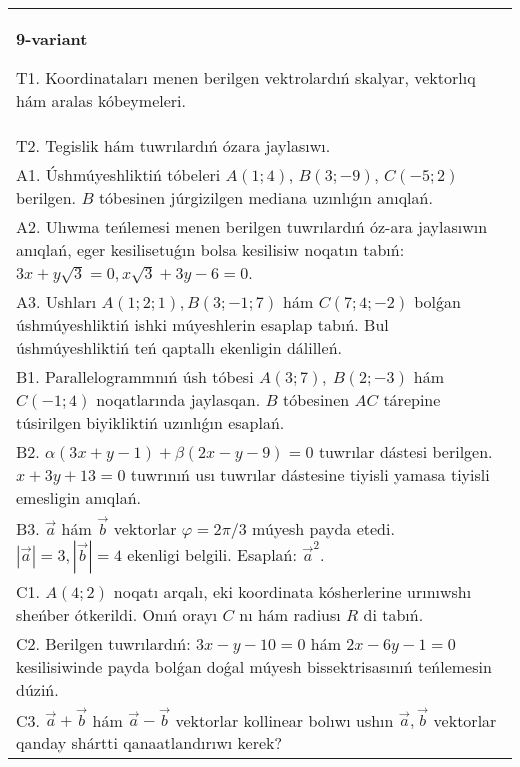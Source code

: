 \documentclass{article}
\begin{document}
\begin{tabular}{m{17cm}}
\textbf{9-variant}
\newline

T1. 
Koordinataları menen berilgen vektrolardıń skalyar, vektorlıq hám aralas kóbeymeleri. \\
T2. 
Tegislik hám tuwrılardıń ózara jaylasıwı.
 \\
A1. 
Úshmúyeshliktiń tóbeleri $A(1;4)$, $B(3;-9)$, $C(-5;2)$
berilgen. $B$ tóbesinen júrgizilgen mediana uzınlıǵın anıqlań.
 \\
A2. 
Ulıwma teńlemesi menen berilgen tuwrılardıń
óz-ara jaylasıwın anıqlań, eger kesilisetuǵın bolsa kesilisiw noqatın
tabıń: $3x+y\sqrt{3}=0, x\sqrt{3}+3y-6=0$.
 \\
A3. 
Ushları $A (1;2;1), B (3;-1;7)$ hám $C(7;4;-2)$ bolǵan úshmúyeshliktiń
ishki múyeshlerin esaplap tabıń. Bul úshmúyeshliktiń teń qaptallı ekenligin dálilleń. 
 \\
B1. 
Parallelogrammnıń úsh tóbesi \(A(3;7),\ B(2;-3)\) hám
\(C(-1;4)\) noqatlarında jaylasqan. $B$ tóbesinen $AC$
tárepine túsirilgen biyikliktiń uzınlıǵın esaplań.
 \\
B2. 
\(\alpha(3x+y-1)+\beta(2x-y-9)=0\) tuwrılar dástesi
berilgen. \(x+3y+13=0\) tuwrınıń usı tuwrılar dástesine tiyisli
yamasa tiyisli emesligin anıqlań.
 \\
B3. 
$\vec{a}$ hám $\vec{b}$ vektorlar $\varphi = 2\pi/3$ múyesh payda etedi. $|\vec{a}| = 3,|\vec{b}| = 4$ ekenligi belgili. Esaplań: 
${\vec{a}}^{2}$. 
 \\
C1. \(A(4;2)\) noqatı arqalı, eki koordinata kósherlerine
urınıwshı sheńber ótkerildi. Onıń orayı $C$ nı hám radiusı
$R$ di tabıń.
 \\
C2. 
Berilgen tuwrılardıń: \(3x - y - 10 = 0\) hám
\(2x - 6y - 1 = 0\) kesilisiwinde payda bolǵan doǵal múyesh
bissektrisasınıń teńlemesin dúziń.
 \\
C3. 
\(\vec{a}+\vec{b}\) hám \(\vec{a} - \vec{b}\) vektorlar kollinear bolıwı ushın \(\vec{a},\vec{b}\) vektorlar qanday shártti qanaatlandırıwı kerek?
 \\

\end{tabular}
\vspace{1cm}
\end{document}

